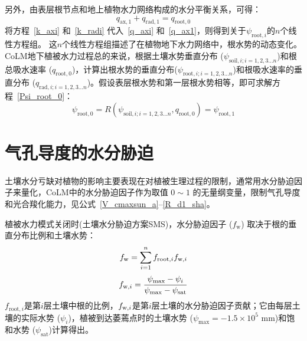 另外，由表层根节点和地上植物水力网络构成的水分平衡关系，可得：
\begin{equation}\label{q_ax1}
  q_{\mathrm{ax,1}}+q_{\mathrm{rad, 1}}=q_{\mathrm{root,0}}
\end{equation}
将方程~\eqref{k_axi} 和~\eqref{k_radi} 代入~\eqref{q_axi} 和~\eqref{q_ax1}，则得到关于$ \psi_{\mathrm{root},i}$的$n$个线性方程组。
这$n$个线性方程组描述了在植物地下水力网络中，根水势的动态变化。CoLM地下植被水力过程总的来说，根据土壤水势垂直分布 ($\psi_{\mathrm{soil},i;i=1,2,3...n}$)和根总吸水速率 ($q_{\mathrm{root,0}}$)，计算出根水势的垂直分布($\psi_{\mathrm{root},i;i=1,2,3...n}$)和根吸水速率的垂直分布 ($q_{\mathrm{rad},i;i=1,2,3...n}$)。假设表层根水势和第一层根水势相等，即可求解方程~\eqref{Psi_root_0}：
\begin{equation}\label{Rfunc}
    \psi_{\mathrm{root,0}}=R\left(\psi_{\mathrm{ {soil }}, i;i=1,2,3...n}, q_{\mathrm{root, 0}}\right)=\psi_{\mathrm{root,1}}
\end{equation}



\section{气孔导度的水分胁迫}\label{气孔导度的水分胁迫}
土壤水分亏缺对植物的影响主要表现在对植被生理过程的限制，通常用水分胁迫因子来量化，CoLM中的水分胁迫因子作为取值 $0\sim 1$ 的无量纲变量，限制气孔导度和光合羧化能力，见公式~\eqref{V_cmaxsun_a}--\eqref{R_d1_sha}。

植被水力模式关闭时(土壤水分胁迫方案SMS)，水分胁迫因子 ($f_{\mathrm {w}}$) 取决于根的垂直分布比例和土壤水势：
\begin{equation}\label{beta_0}
  f_{\rm w}=\sum_{i=1}^{n} f_{\mathrm {root},i} f_{{\rm w},i}
\end{equation}
%
\begin{equation}\label{beta_i}
  f_{{\rm w},i}=\frac{\psi_{\mathrm{\max }}-\psi_i}{\psi_{\mathrm{\max }}-\psi_{\mathrm{s a t}}}
\end{equation}
$f_{\mathrm {root},i}$是第$i$层土壤中根的比例，$f_{{\rm w},i}$是第$i$层土壤的水分胁迫因子贡献；它由每层土壤的实际水势 ($\psi_i$)，植被到达萎蔫点时的土壤水势 ($\psi_{\mathrm{max}}=-1.5\times 10^5$ \unit{mm})和饱和水势 ($\psi_{\mathrm{sat}}$)计算得出。


